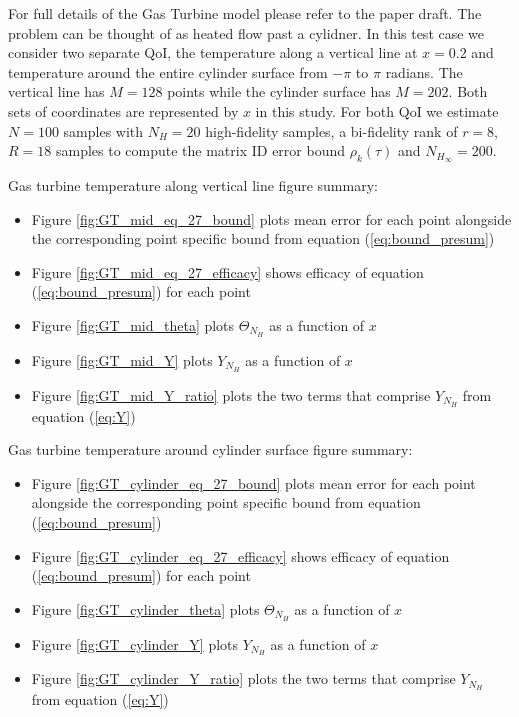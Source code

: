 \documentclass{report}
\begin{document}
For full details of the Gas Turbine model please refer to the paper draft. The problem can be thought of as heated flow past a cylidner. In this test case we consider two separate QoI, the temperature along a vertical line at $x=0.2$ and temperature around the entire cylinder surface from $-\pi$ to $\pi$ radians. The vertical line has $M=128$ points while the cylinder surface has $M=202$. Both sets of coordinates are represented by $x$ in this study. 
For both QoI we estimate $N=100$ samples with $N_H = 20$ high-fidelity samples, a bi-fidelity rank of $r=8$, $R=18$ samples to compute the matrix ID error bound $\rho_k(\tau)$ and $N_{H_\infty}=200$. 

Gas turbine temperature along vertical line figure summary: 
\begin{itemize}
\item Figure \ref{fig:GT_mid_eq_27_bound} plots mean error for each point alongside the corresponding point specific bound from equation (\ref{eq:bound_presum}) 
\item Figure \ref{fig:GT_mid_eq_27_efficacy} shows efficacy of equation (\ref{eq:bound_presum}) for each point
\item Figure \ref{fig:GT_mid_theta} plots $\Theta_{N_H}$ as a function of $x$
\item Figure \ref{fig:GT_mid_Y} plots $Y_{N_H}$ as a function of $x$
\item Figure \ref{fig:GT_mid_Y_ratio} plots the two terms that comprise $Y_{N_H}$ from equation (\ref{eq:Y})
\end{itemize}

Gas turbine temperature around cylinder surface figure summary: 
\begin{itemize}
\item Figure \ref{fig:GT_cylinder_eq_27_bound} plots mean error for each point alongside the corresponding point specific bound from equation (\ref{eq:bound_presum}) 
\item Figure \ref{fig:GT_cylinder_eq_27_efficacy} shows efficacy of equation (\ref{eq:bound_presum}) for each point
\item Figure \ref{fig:GT_cylinder_theta} plots $\Theta_{N_H}$ as a function of $x$
\item Figure \ref{fig:GT_cylinder_Y} plots $Y_{N_H}$ as a function of $x$
\item Figure \ref{fig:GT_cylinder_Y_ratio} plots the two terms that comprise $Y_{N_H}$ from equation (\ref{eq:Y})
\end{itemize}
\end{document}
